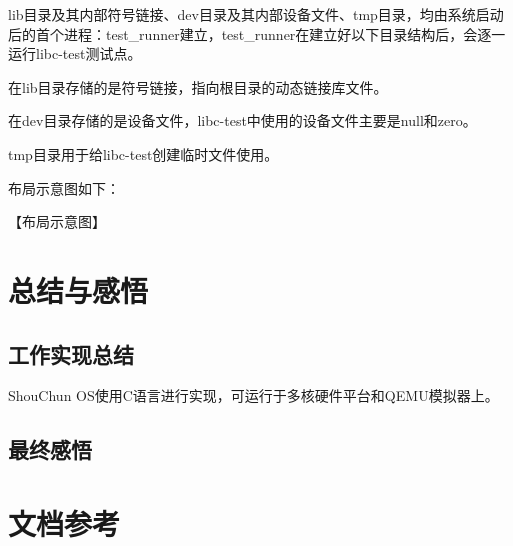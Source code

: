 \documentclass[UTF8,a4paper,10pt]{ctexart}
\begin{document}
lib目录及其内部符号链接、dev目录及其内部设备文件、tmp目录，均由系统启动后的首个进程：test\_runner建立，test\_runner在建立好以下目录结构后，会逐一运行libc-test测试点。

在lib目录存储的是符号链接，指向根目录的动态链接库文件。

在dev目录存储的是设备文件，libc-test中使用的设备文件主要是null和zero。

tmp目录用于给libc-test创建临时文件使用。

布局示意图如下：

【布局示意图】

\section{总结与感悟}

\subsection{工作实现总结}

ShouChun OS使用C语言进行实现，可运行于多核硬件平台和QEMU模拟器上。


\subsection{最终感悟}

\section{文档参考}
\end{document}
